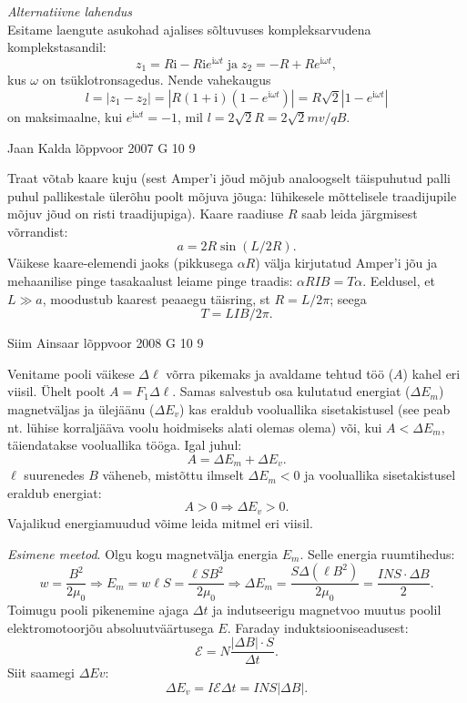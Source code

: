 \documentclass[11pt]{article}
\begin{document}
{{{\em Alternatiivne lahendus}\\
Esitame laengute asukohad ajalises sõltuvuses kompleksarvudena komplekstasandil:
$$z_1=R\mathrm{i} - R\mathrm{i}e^{\mathrm{i}\omega t}\;\mbox{ja}\; z_2= -R + Re^{\mathrm{i}\omega t},$$ kus
$\omega$ on tsüklotronsagedus. Nende vahekaugus
$$l=|z_1-z_2|=|R(1+\mathrm{i})(1-e^{\mathrm{i}\omega t})|=R\sqrt 2|1-e^{\mathrm{i}\omega t}|$$ on maksimaalne, kui $e^{\mathrm{i}\omega t}=-1$, mil $l=2\sqrt{2}R=2\sqrt{2}mv/qB$.
\fi
}

{Jaan Kalda} %
{lõppvoor} %
{2007} %
{G 10} %
{9} %
{

\ifSolution
Traat võtab kaare kuju (sest Amper’i jõud mõjub analoogselt täispuhutud palli puhul pallikestale ülerõhu poolt mõjuva jõuga: lühikesele mõttelisele traadijupile mõjuv jõud on risti traadijupiga). Kaare raadiuse $R$ saab leida järgmisest võrrandist:
\[
a = 2R \sin (L/2R).
\]
Väikese kaare-elemendi jaoks (pikkusega $\alpha R$) välja kirjutatud Amper’i jõu ja mehaanilise pinge tasakaalust leiame pinge traadis: $\alpha RIB = T \alpha$. Eeldusel, et $L \gg a$, moodustub kaarest peaaegu täisring, st $R = L/2\pi$; seega
\[
T = LIB/2\pi.
\]
\fi
}

{Siim Ainsaar} %
{lõppvoor} %
{2008} %
{G 10} %
{9} %
{

\ifSolution
Venitame pooli väikese $\Delta \ell$ võrra pikemaks ja avaldame tehtud töö ($A$) kahel eri viisil. Ühelt poolt $A = F_1\Delta \ell$. Samas salvestub osa kulutatud energiat ($\Delta E_m$) magnetväljas ja ülejäänu ($\Delta E_v$) kas eraldub vooluallika sisetakistusel (see peab nt. lühise korraljääva voolu hoidmiseks alati olemas olema) või, kui $A < \Delta E_m$, täiendatakse vooluallika tööga. Igal juhul:
\[
A = \Delta E_m + \Delta E_v.
\]
$\ell$ suurenedes $B$ väheneb, mistõttu ilmselt $\Delta E_m < 0$ ja vooluallika sisetakistusel eraldub energiat:
\[
A > 0 \Longrightarrow \Delta E_v > 0.
\]
Vajalikud energiamuudud võime leida mitmel eri viisil.

\emph{Esimene meetod}. Olgu kogu magnetvälja energia $E_m$. Selle energia ruumtihedus:
\[
w=\frac{B^{2}}{2 \mu_{0}} \Longrightarrow E_{m}=w \ell S=\frac{\ell S B^{2}}{2 \mu_{0}} \Longrightarrow \Delta E_{m}=\frac{S \Delta\left(\ell B^{2}\right)}{2 \mu_{0}}=\frac{I N S \cdot \Delta B}{2}.
\]
Toimugu pooli pikenemine ajaga $\Delta t$ ja indutseerigu magnetvoo muutus poolil elektromotoorjõu absoluutväärtusega $E$. Faraday induktsiooniseadusest:
\[
\mathcal{E}=N \frac{|\Delta B| \cdot S}{\Delta t}.
\]
Siit saamegi $\Delta Ev$:
\[
\Delta E_v = I\mathcal{E}\Delta t = INS|\Delta B|.
\]

}}
\end{document}
